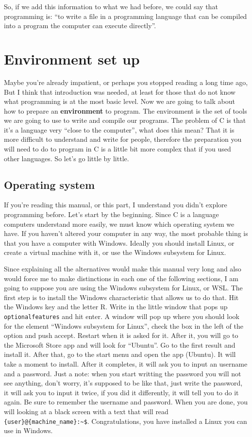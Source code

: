 \documentclass[a4paper]{article}
\begin{document}
So, if we add this information to what we had before, we could say that
programming is: ``to write a file in a programming language that can be
compiled into a program the computer can execute directly''.

\section{Environment set up}
Maybe you're already impatient, or perhaps you stopped reading a long time
ago, But I think that introduction was needed, at least for those that do not
know what programming is at the most basic level. Now we are going to talk about
how to prepare an \textbf{environment} to program. The environment is the set of
tools we are going to use to write and compile our programs.
The problem of C is that it's a language very ``close to the computer'', what
does this mean? That it is more difficult to understand and write for people,
therefore the preparation you will need to do to program in C is a little bit
more complex that if you used other languages. So let's go little by little.

\subsection{Operating system}
If you're reading this manual, or this part, I understand you didn't explore
programming before. Let's start by the beginning. Since C is a language
computers understand more easily, we must know which operating system we have.
If you haven't altered your computer in any way, the most probable thing is
that you have a computer with Windows. Ideally you should install Linux, or
create a virtual machine with it, or use the Windows subsystem for
Linux.

Since explaining all the alternatives would make this manual very long and also
would force me to make distinctions in each one of the following sections, I am
going to suppose you are using the Windows subsystem for Linux, or WSL. The
first step is to install the Windows characteristic that allows us to
do that. Hit the Windows key and the letter R. Write in the little window that
pops up \verb!optionalfeatures! and hit enter. A window will pop up
where you should look for the element ``Windows subsystem for Linux'', check the
box in the left of the option and push accept. Restart when it is asked for it.
After it, you will go to the Microsoft Store app and will look for ``Ubuntu''.
Go to the first result and install it. After that, go to the start menu and
open the app (Ubuntu). It will take a moment to install. After it completes,
it will ask you to input an username and a password. Just a note: when you start
writting the password you will not see anything, don't worry, it's supposed to
be like that, just write the password, it will ask you to input it twice, if
you did it differently, it will tell you to do it again. Be sure to remember
the username and password. When you are done, you will looking at a black screen
with a text that will read \verb!{user}@{machine_name}:~$!. Congratulations,
you have installed a Linux you can use in Windows.
\end{document}
